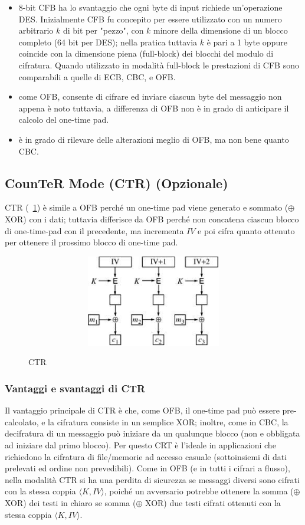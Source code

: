 \begin{itemize}
\item 8-bit CFB ha lo svantaggio che ogni byte di input richiede un'operazione DES. Inizialmente CFB fu concepito per essere utilizzato con un numero arbitrario $k$ di bit per "pezzo", con $k$ minore della dimensione di un blocco completo (64 bit per DES); nella pratica tuttavia $k$ è pari a 1 byte oppure coincide con la dimensione piena (full-block) dei blocchi del modulo di cifratura. Quando utilizzato in modalità full-block le prestazioni di CFB sono comparabili a quelle di ECB, CBC, e OFB.
\item come OFB, consente di cifrare ed inviare ciascun byte del messaggio non appena è noto tuttavia, a differenza di OFB non è in grado di anticipare il calcolo del one-time pad. 
\item è in grado di rilevare delle alterazioni meglio di OFB, ma non bene quanto CBC.
\end{itemize}
\subsection{CounTeR Mode (CTR) (Opzionale)}
CTR (\figurename ~\ref{fig:CTR}) è simile a OFB perché un one-time pad viene generato e sommato ($\oplus$ XOR) con i dati; tuttavia differisce da OFB perché non concatena ciascun blocco di one-time-pad con il precedente, ma incrementa $IV$ e poi cifra quanto ottenuto per ottenere il prossimo blocco di one-time pad. 
\begin{figure}[htbp]
	\centering%
	\subfigure%
	{\includegraphics[height=4cm, width=12cm, keepaspectratio]{Immagini/modalita_operative/CTR.png}}
	\caption{CTR \label{fig:CTR}} 	
\end{figure}
\subsubsection{Vantaggi e svantaggi di CTR}
Il vantaggio principale di CTR è che, come OFB, il one-time pad può essere pre-calcolato, e la cifratura consiste in un semplice XOR; inoltre, come in CBC, la decifratura di un messaggio può iniziare da un qualunque blocco (non e obbligata ad iniziare dal primo blocco). Per questo CRT è l'ideale in applicazioni che richiedono la cifratura di file/memorie ad accesso casuale (sottoinsiemi di dati prelevati ed ordine non prevedibili).\newline \newline
Come in OFB (e in tutti i cifrari a flusso), nella modalità CTR si ha una perdita di sicurezza se messaggi diversi sono cifrati con la stessa coppia $\langle K, IV \rangle$, poiché un avversario potrebbe ottenere la somma ($\oplus$ XOR) dei testi in chiaro se somma ($\oplus$ XOR) due testi cifrati ottenuti con la stessa coppia $\langle K, IV \rangle$.

